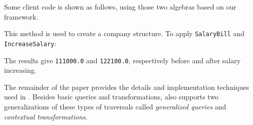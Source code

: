 
  

Some client code is shown as follows, using those two algebras based on our framework.


This method is used to create a company structure. To apply \lstinline{SalaryBill} and \lstinline{IncreaseSalary}:


The results give \lstinline{111000.0} and \lstinline{122100.0}, respectively before and after salary increasing.


The remainder of the paper provides the details and implementation
techniques used in \Name. Besides basic queries and transformations,
\name also supports two generalizations of these types of traversals
called \emph{generalized queries} and \emph{contextual transformations}.

